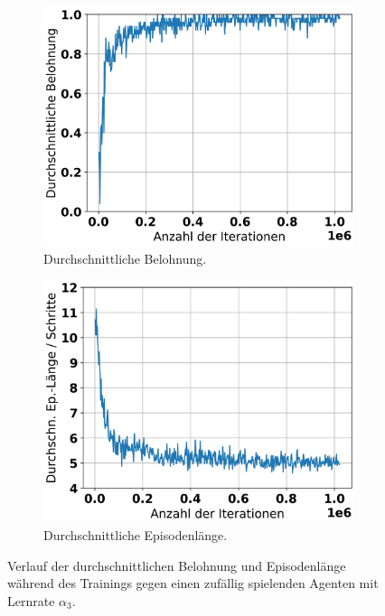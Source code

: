 \begin{figure}[ht!]
	\begin{subfigure}[b]{0.48\textwidth}
		\includegraphics[width=\textwidth]{Bilder/random-training/history_random_0_0001_graph_episode_rewards.png}
		\caption{Durchschnittliche Belohnung.}
		\label{fig:f19}
	\end{subfigure}
	\hfill
	\begin{subfigure}[b]{0.48\textwidth}
		\includegraphics[width=\textwidth]{Bilder/random-training/history_random_0_0001_graph_episode_lengths.png}
		\caption{Durchschnittliche Episodenlänge.}
		\label{fig:f20}
	\end{subfigure}
	\caption{Verlauf der durchschnittlichen Belohnung und Episodenlänge während des Trainings gegen einen zufällig spielenden Agenten mit Lernrate $\alpha_3$.}
\end{figure}

